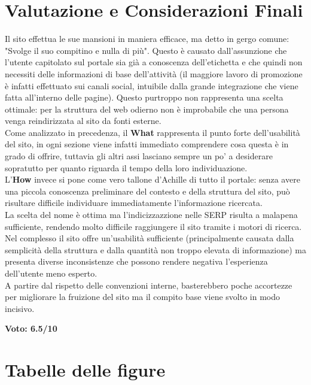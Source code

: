 \documentclass[10pt,a4paper]{article}
\begin{document}
\section{Valutazione e Considerazioni Finali}
Il sito effettua le sue mansioni in maniera efficace, ma detto in gergo comune: "Svolge il suo compitino e nulla di più". Questo è causato dall'assunzione che l'utente capitolato sul portale sia già a conoscenza dell'etichetta e che quindi non necessiti delle informazioni di base dell'attività (il maggiore lavoro di promozione è infatti effettuato sui canali social, intuibile dalla grande integrazione che viene fatta all'interno delle pagine). Questo purtroppo non rappresenta una scelta ottimale: per la struttura del web odierno non è improbabile che una persona venga reindirizzata al sito da fonti esterne. \\
Come analizzato in precedenza, il \textbf{What} rappresenta il punto forte dell'usabilità del sito, in ogni sezione viene infatti immediato comprendere cosa questa è in grado di offrire, tuttavia gli altri assi lasciano sempre un po' a desiderare sopratutto per quanto riguarda il tempo della loro individuazione. \\
L'\textbf{How} invece si pone come vero tallone d'Achille di tutto il portale:  senza avere una piccola conoscenza preliminare del contesto e della struttura del sito, può risultare difficile individuare immediatamente l'informazione ricercata. \\
La scelta del nome è ottima ma l'indicizzazzione nelle SERP risulta a malapena sufficiente, rendendo molto difficile raggiungere il sito tramite i motori di ricerca. \\
Nel complesso il sito offre un'usabilità sufficiente (principalmente causata dalla semplicità della struttura e dalla quantità non troppo elevata di informazione) ma presenta diverse inconsistenze che possono rendere negativa l'esperienza dell'utente meno esperto. \\
A partire dal rispetto delle convenzioni interne, basterebbero poche accortezze per migliorare la fruizione del sito ma il compito base viene svolto in modo incisivo. \\
\begin{center}
	\huge{\textbf{Voto: 6.5/10}}
\end{center}
\newpage
\appendix
\section{Tabelle delle figure}
\renewcommand{\arraystretch}{1.5}
\end{document}
